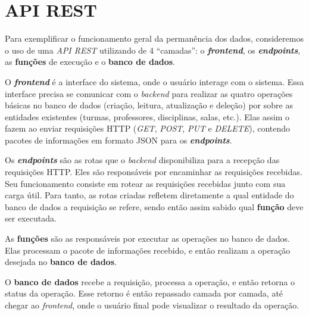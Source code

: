 
\section{API REST} \label{sec:REST} %

Para exemplificar o funcionamento geral da permanência dos dados, consideremos o uso de uma \textit{API REST} utilizando de 4 ``camadas'': o \textbf{\textit{frontend}}, os \textbf{\textit{endpoints}}, as \textbf{funções} de execução e o \textbf{banco de dados}.


O \textbf{\textit{frontend}} é a interface do sistema, onde o usuário interage com o sistema. Essa interface precisa se comunicar com o \textit{backend} para realizar as quatro operações básicas no banco de dados (criação, leitura, atualização e deleção) por sobre as entidades existentes (turmas, professores, disciplinas, salas, etc.). Elas assim o fazem ao enviar requisições HTTP (\textit{GET}, \textit{POST}, \textit{PUT} e \textit{DELETE}), contendo pacotes de informações em formato JSON para os \textbf{\textit{endpoints}}.

Os \textbf{\textit{endpoints}} são as rotas que o \textit{backend} disponibiliza para a recepção das requisições HTTP. Eles são responsáveis por encaminhar as requisições recebidas. Seu funcionamento consiste em rotear as requisições recebidas junto com sua carga útil. Para tanto, as rotas criadas refletem diretamente a qual entidade do banco de dados a requisição se refere, sendo então assim sabido qual \textbf{função} deve ser executada.

As \textbf{funções} são as responsáveis por executar as operações no banco de dados. Elas processam o pacote de informações recebido, e então realizam a operação desejada no \textbf{banco de dados}.

O \textbf{banco de dados} recebe a requisição, processa a operação, e então retorna o status da operação. Esse retorno é então repassado camada por camada, até chegar ao \textit{frontend}, onde o usuário final pode visualizar o resultado da operação.

